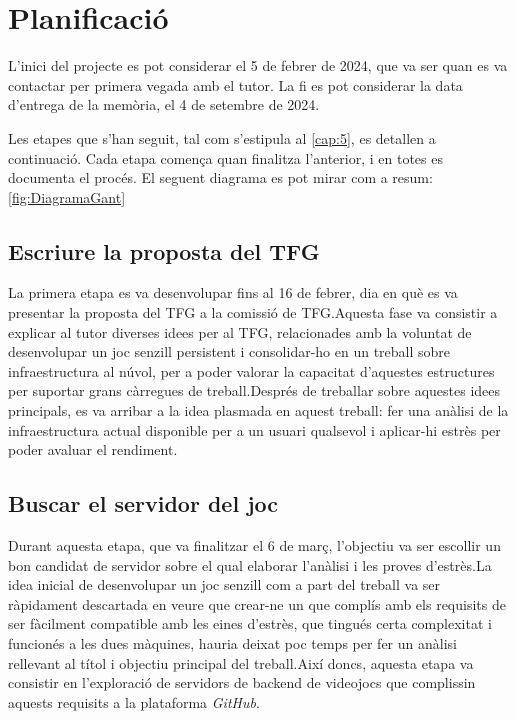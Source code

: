 \chapter{Planificació}

L'inici del projecte es pot considerar el 5 de febrer de 2024, que va ser quan es va contactar per primera vegada amb el tutor. La fi es pot considerar la data d'entrega de la memòria, el 4 de setembre de 2024.

Les etapes que s'han seguit, tal com s'estipula al \autoref{cap:5}, es detallen a continuació. Cada etapa comença quan finalitza l'anterior, i en totes es documenta el procés. El seguent diagrama es pot mirar com a resum: \autoref{fig:DiagramaGant}

\section{Escriure la proposta del TFG}

La primera etapa es va desenvolupar fins al 16 de febrer, dia en què es va presentar la proposta del TFG a la comissió de TFG.Aquesta fase va consistir a explicar al tutor diverses idees per al TFG, relacionades amb la voluntat de desenvolupar un joc senzill persistent i consolidar-ho en un treball sobre infraestructura al núvol, per a poder valorar la capacitat d'aquestes estructures per suportar grans càrregues de treball.Després de treballar sobre aquestes idees principals, es va arribar a la idea plasmada en aquest treball: fer una anàlisi de la infraestructura actual disponible per a un usuari qualsevol i aplicar-hi estrès per poder avaluar el rendiment.

\newpage
\section{Buscar el servidor del joc}

Durant aquesta etapa, que va finalitzar el 6 de març, l'objectiu va ser escollir un bon candidat de servidor sobre el qual elaborar l'anàlisi i les proves d'estrès.La idea inicial de desenvolupar un joc senzill com a part del treball va ser ràpidament descartada en veure que crear-ne un que complís amb els requisits de ser fàcilment compatible amb les eines d'estrès, que tingués certa complexitat i funcionés a les dues màquines, hauria deixat poc temps per fer un anàlisi rellevant al títol i objectiu principal del treball.Així doncs, aquesta etapa va consistir en l'exploració de servidors de backend de videojocs que complissin aquests requisits a la plataforma \textit{GitHub}.


